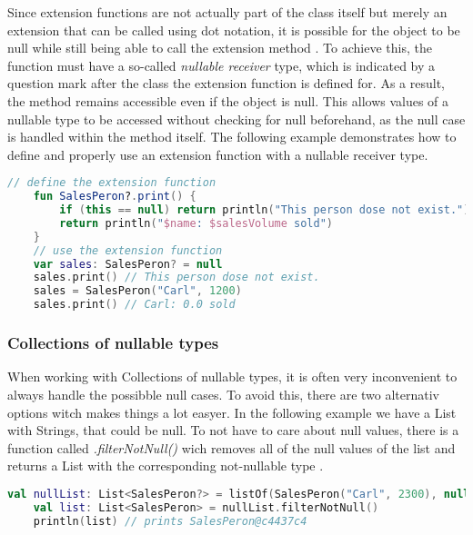 \documentclass[a4paper, 11pt]{article}
\begin{document}
  Since extension functions are not actually part of the class itself but merely an extension that can be called using dot notation, it is possible for the object to be null while still being able to call the extension method \cite{nullsafety-nullable-receiver}. To achieve this, the function must have a so-called \textit{nullable receiver} type, which is indicated by a question mark after the class the extension function is defined for. As a result, the method remains accessible even if the object is null. This allows values of a nullable type to be accessed without checking for null beforehand, as the null case is handled within the method itself. The following example demonstrates how to define and properly use an extension function with a nullable receiver type.
  \begin{lstlisting}[language=Kotlin,title={Usage of an extension function}]
    // define the extension function
    fun SalesPeron?.print() {
        if (this == null) return println("This person dose not exist.")
        return println("$name: $salesVolume sold")
    }
    // use the extension function
    var sales: SalesPeron? = null
    sales.print() // This person dose not exist.
    sales = SalesPeron("Carl", 1200)
    sales.print() // Carl: 0.0 sold
  \end{lstlisting}

\subsubsection{Collections of nullable types}
  When working with Collections of nullable types, it is often very inconvenient to always handle the possibble null cases. To avoid this, there are two alternativ options witch makes things a lot easyer.
  In the following example we have a List with Strings, that could be null. To not have to care about null values, there is a function called \textit{.filterNotNull()} wich removes all of the null values of the list and returns a List with the corresponding not-nullable type \cite{nullsafety-collections}.
  \begin{lstlisting}[language=Kotlin]
    val nullList: List<SalesPeron?> = listOf(SalesPeron("Carl", 2300), null)
    val list: List<SalesPeron> = nullList.filterNotNull()
    println(list) // prints SalesPeron@c4437c4
  \end{lstlisting}
\end{document}
